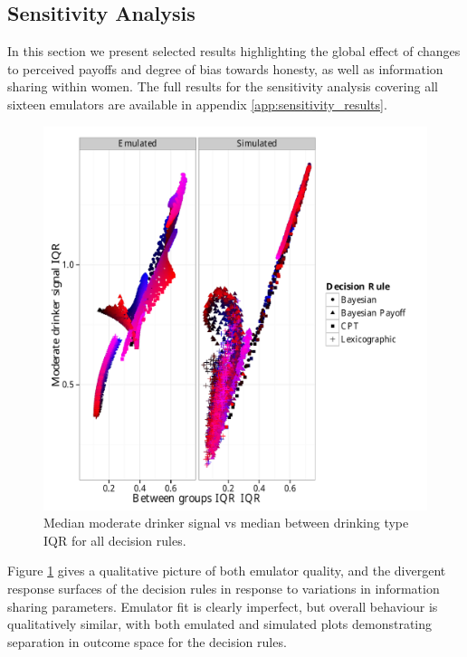 \subsection{Sensitivity Analysis}
\label{sub:sa_results}

In this section we present selected results highlighting the global effect of changes to perceived payoffs and degree of bias towards honesty, as well as information sharing within women. The full results for the sensitivity analysis covering all sixteen emulators are available in appendix \ref{app:sensitivity_results}.

\begin{figure}[h!]
\begin{adjustbox}{center}\includegraphics[width=0.8\paperwidth]{figures/sharing_emulated_simulated}\end{adjustbox}
\caption{Median moderate drinker signal vs median between drinking type IQR for all decision rules.}
\label{fig:outcome_plots}
\end{figure}

Figure \ref{fig:outcome_plots} gives a qualitative picture of both emulator quality, and the divergent response surfaces of the decision rules in response to variations in information sharing parameters. Emulator fit is clearly imperfect, but overall behaviour is qualitatively similar, with both emulated and simulated plots demonstrating separation in outcome space for the decision rules.

